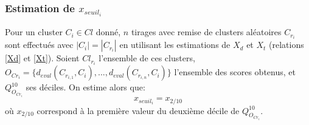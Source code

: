\subsubsection{Estimation de $x_{seuil_{i}}$}
	Pour un cluster $C_{i} \in Cl$ donné, $n$ tirages avec remise de clusters aléatoires $C_{r_{i}}$ sont effectués avec $|C_{i}|=|C_{r_{i}}|$ en utilisant les estimations de $X_{d}$ et $X_{t}$ (relations \ref{Xd} et \ref{Xt}). Soient $Cl_{r_{i}}$ l'ensemble de ces clusters, $O_{Cr_{i}}=\{d_{eval}(C_{r_{i,1}},C_{i}),...,d_{eval}(C_{r_{i,n}},C_{i})\}$ l'ensemble des scores obtenus, et $Q_{O_{Cr_{i}}}^{10}$ ses déciles. On estime alors que:
     \begin{equation}
     x_{seuil_{i}}=x_{2/10}
	\end{equation}
	où  $x_{2/10}$ correspond à la première valeur du deuxième décile de $Q_{O_{Cr_{i}}}^{10}$.  



